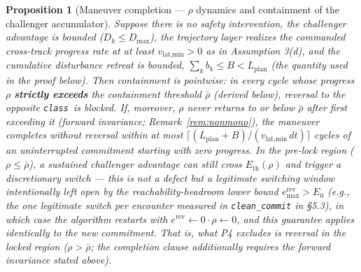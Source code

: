 \documentclass[11pt]{article}
\newtheorem{proposition}{Proposition}
\newcommand{\Class}{\texttt{class}}
\newcommand{\Erev}{e^{\text{rev}}}
\newcommand{\Eremax}{e^{\text{rev}}_{\max}}
\newcommand{\Eth}{E_{\text{th}}}
\newcommand{\code}[1]{\texttt{#1}}
\begin{document}
\begin{proposition}[Maneuver completion --- $\rho$ dynamics and containment of the challenger accumulator] \label{prop:p4}
Suppose there is no safety intervention, the challenger advantage is bounded ($D_k \le D_{\max}$), the trajectory layer realizes the commanded cross-track progress rate at at least $v_{\text{lat,min}} > 0$ as in Assumption 3(d), and the cumulative disturbance retreat is bounded, $\sum_k b_k \le B < L_{\text{plan}}$ (the quantity used in the proof below). Then containment is \emph{pointwise}: in every cycle whose progress $\rho$ \textbf{strictly exceeds} the containment threshold $\bar\rho$ (derived below), reversal to the opposite \Class\ is blocked. If, moreover, $\rho$ never returns to or below $\bar\rho$ after first exceeding it (forward invariance; Remark~\ref{rem:nonmono}), the maneuver completes without reversal within at most $\lceil(L_{\text{plan}}+B)/(v_{\text{lat,min}}\, dt)\rceil$ cycles of an uninterrupted commitment starting with zero progress. In the pre-lock region ($\rho \le \bar\rho$), a sustained challenger advantage can still cross $\Eth(\rho)$ and trigger a discretionary switch --- this is not a defect but a legitimate switching window intentionally left open by the reachability-headroom lower bound $\Eremax > E_0$ (e.g., the one legitimate switch per encounter measured in \code{clean\_commit} in \S5.3), in which case the algorithm restarts with $\Erev \leftarrow 0 \cdot \rho \leftarrow 0$, and this guarantee applies identically to the new commitment. That is, what P4 excludes is reversal in the locked region ($\rho > \bar\rho$; the completion clause additionally requires the forward invariance stated above).
\end{proposition}
\end{document}
